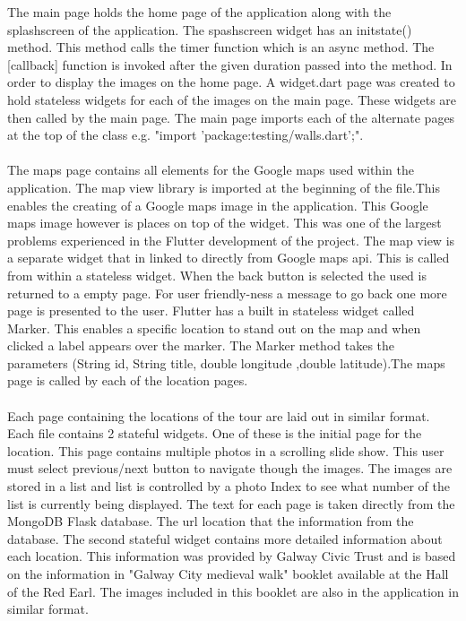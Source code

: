 The main page holds the home page of the application along with the splashscreen of the application. The spashscreen widget has an initstate() method. This method calls the timer function which is an async method. The [callback] function is invoked after the given duration passed into the method. In order to display the images on the home page. A widget.dart page was created to hold stateless widgets for each of the images on the main page. These widgets are then called by the main page. The main page imports each of the alternate pages at the top of the class e.g. "import 'package:testing/walls.dart';".
\paragraph{}The maps page contains all elements for the Google maps used within the application. The map view library is imported at the beginning of the file.This enables the creating of a Google maps image in the application. This Google maps image however is places on top of the widget. This was one of the largest problems experienced in the Flutter development of the project. The map view is a separate widget that in linked to directly from Google maps api. This is called from within a stateless widget. When the back button is selected the used is returned to a empty page. For user friendly-ness a message to go back one more page is presented to the user. Flutter has a built in stateless widget called Marker. This enables a specific location to stand out on the map and when clicked a label appears over the marker. The Marker method takes the parameters (String id, String title, double longitude ,double latitude).The maps page is called by each of the location pages.
\paragraph{}Each page containing the locations of the tour are laid out in similar format. Each file contains 2 stateful widgets. One of these is the initial page for the location. This page contains multiple photos in a scrolling slide show. This user must select previous/next button to navigate though the images. The images are stored in a list and list is controlled by a photo Index to see what number of the list is currently being displayed. The text for each page is taken directly from the MongoDB Flask database. The url location that the information from the database. The second stateful widget contains more detailed information about each location. This information was provided by Galway Civic Trust and is based on the information in "Galway City medieval walk" booklet available at the Hall of the Red Earl. The images included in this booklet are also in the application in similar format.



